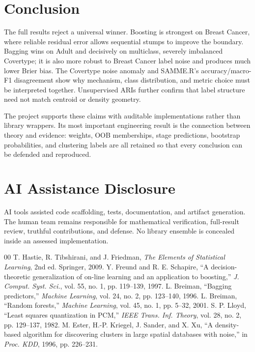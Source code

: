 \documentclass[conference]{IEEEtran}
\begin{document}
\section{Conclusion}
The full results reject a universal winner. Boosting is strongest on Breast
Cancer, where reliable residual error allows sequential stumps to improve the
boundary. Bagging wins on Adult and decisively on multiclass, severely
imbalanced Covertype; it is also more robust to Breast Cancer label noise and
produces much lower Brier bias. The Covertype noise anomaly and SAMME.R's
accuracy/macro-F1 disagreement show why mechanism, class distribution, and
metric choice must be interpreted together. Unsupervised ARIs further confirm
that label structure need not match centroid or density geometry.

The project supports these claims with auditable implementations rather than
library wrappers. Its most important engineering result is the connection
between theory and evidence: weights, OOB memberships, stage predictions,
bootstrap probabilities, and clustering labels are all retained so that every
conclusion can be defended and reproduced.

\clearpage
\section*{AI Assistance Disclosure}
AI tools assisted code scaffolding, tests, documentation, and artifact
generation. The human team remains responsible for mathematical verification,
full-result review, truthful contributions, and defense. No library ensemble is
concealed inside an assessed implementation.

\begin{thebibliography}{00}
 T. Hastie, R. Tibshirani, and J. Friedman, \emph{The Elements of
Statistical Learning}, 2nd ed. Springer, 2009.
 Y. Freund and R. E. Schapire, ``A decision-theoretic
generalization of on-line learning and an application to boosting,''
\emph{J. Comput. Syst. Sci.}, vol. 55, no. 1, pp. 119--139, 1997.
 L. Breiman, ``Bagging predictors,'' \emph{Machine Learning},
vol. 24, no. 2, pp. 123--140, 1996.
 L. Breiman, ``Random forests,'' \emph{Machine Learning}, vol. 45,
no. 1, pp. 5--32, 2001.
 S. P. Lloyd, ``Least squares quantization in PCM,''
\emph{IEEE Trans. Inf. Theory}, vol. 28, no. 2, pp. 129--137, 1982.
 M. Ester, H.-P. Kriegel, J. Sander, and X. Xu, ``A
density-based algorithm for discovering clusters in large spatial databases
with noise,'' in \emph{Proc. KDD}, 1996, pp. 226--231.
\end{thebibliography}
\end{document}

